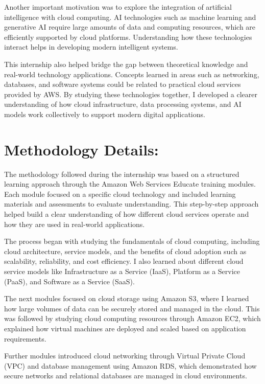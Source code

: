 \documentclass[12pt, a4paper, oneside]{report}
\begin{document}
Another important motivation was to explore the integration of artificial intelligence 
with cloud computing. AI technologies such as machine learning and generative AI 
require large amounts of data and computing resources, which are efficiently supported 
by cloud platforms. Understanding how these technologies interact helps in developing 
modern intelligent systems.

This internship also helped bridge the gap between theoretical knowledge and real-world 
technology applications. Concepts learned in areas such as networking, databases, and 
software systems could be related to practical cloud services provided by AWS. By 
studying these technologies together, I developed a clearer understanding of how cloud 
infrastructure, data processing systems, and AI models work collectively to support 
modern digital applications.
\newpage
\section{Methodology Details:}

The methodology followed during the internship was based on a structured learning 
approach through the Amazon Web Services Educate training modules. Each module 
focused on a specific cloud technology and included learning materials and assessments 
to evaluate understanding. This step-by-step approach helped build a clear 
understanding of how different cloud services operate and how they are used in 
real-world applications.

The process began with studying the fundamentals of cloud computing, including cloud 
architecture, service models, and the benefits of cloud adoption such as scalability, 
reliability, and cost efficiency. I also learned about different cloud service models like 
Infrastructure as a Service (IaaS), Platform as a Service (PaaS), and Software as a 
Service (SaaS).

The next modules focused on cloud storage using Amazon S3, where I learned how 
large volumes of data can be securely stored and managed in the cloud. This was 
followed by studying cloud computing resources through Amazon EC2, which 
explained how virtual machines are deployed and scaled based on application 
requirements.

Further modules introduced cloud networking through Virtual Private Cloud (VPC) 
and database management using Amazon RDS, which demonstrated how secure 
networks and relational databases are managed in cloud environments.
\end{document}
